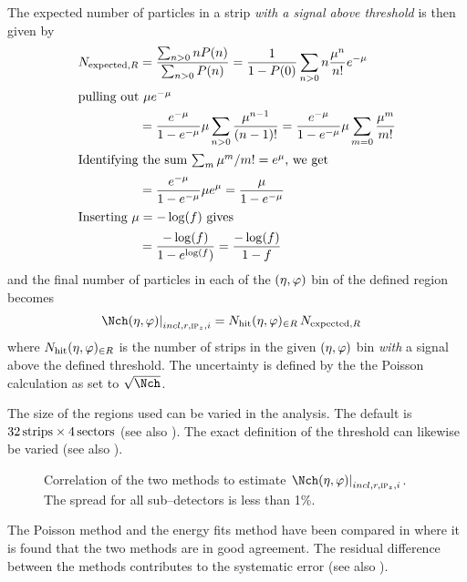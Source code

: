 The expected number of particles in a strip \emph{with a signal above
  threshold} is then given by
\begin{align}
  N_{\text{expected},R} &= \frac{\sum_{n>0}nP(n)}{\sum_{n>0}P(n)} 
  =  \frac1{1-P(0)}\sum_{n>0}n\frac{\mu^n}{n!}e^{-\mu} \nonumber\\
  \intertext{pulling out $\mu e^{-\mu}$}\nonumber
  &= \frac{e^{-\mu}}{1-e^{-\mu}}\mu\sum_{n>0}\frac{\mu^{n-1}}{(n-1)!} 
  =
  \frac{e^{-\mu}}{1-e^{-\mu}}\mu\sum_{m=0}\frac{\mu^m}{m!}\\
  \intertext{Identifying the sum $\sum_m\mu^m/m! = e^{\mu}$, we get}\nonumber
  &= \frac{e^{-\mu}}{1-e^{-\mu}}\mu e^{\mu}  = 
  \frac{\mu}{1-e^{-\mu}}\nonumber\\
  \intertext{Inserting $\mu=-\log(f)$ gives}\nonumber
  &=
  \frac{-\log(f)}{1-e^{\log(f})}
   =  \frac{-\log(f)}{1-f}
\end{align}
and the final number of particles in each of the $(\eta,\varphi)$ bin of the
defined region becomes 
\begin{align}
  \label{eq:density2}
  \dndetadphi[incl,r,\subIPz,i] &= \Nhit{}\,N_{\text{expected},R} 
\end{align}
where ${N_{\text{hit}}(\eta,\varphi)_{\in R}}{}$ is the number of strips in the given $(\eta,\varphi)$ bin
\emph{with} a signal above the defined threshold.  The uncertainty is
defined by the the Poisson calculation as set to $\sqrt{\Nch}$. 

The size of the regions used can be varied in the analysis.  The
default is $\unit[32]{strips}\times\unit[4]{sectors}$ (see also
).  The exact definition of the threshold can
likewise be varied (see also ). 

\begin{figure}[htbp]
  \centering
  \caption{Correlation of the two methods to estimate
    $\dndetadphi[incl,r,\subIPz,i]$.  The spread for all sub--detectors is
    less than 1\%.}
  \label{fig:density:corr}
\end{figure}


The Poisson method and the energy fits method have been compared in
\cite{hhd:2009} where it is found that the two methods are in good
agreement. The residual difference between the methods contributes to
the systematic error (see also ).


